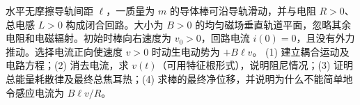 水平无摩擦导轨间距 \(\ell\)，一质量为 \(m\) 的导体棒可沿导轨滑动，并与电阻 \(R>0\)、总电感 \(L>0\) 构成闭合回路。大小为 \(B>0\) 的均匀磁场垂直轨道平面，忽略其余电阻和电磁辐射。初始时棒向右速度为 \(v_0>0\)，回路电流 \(i(0)=0\)，且没有外力推动。选择电流正向使速度 \(v>0\) 时动生电动势为 \(+B\ell v\)。
(1) 建立耦合运动及电路方程；(2) 消去电流，求 \(v(t)\)（可用特征根形式），说明阻尼情况；(3) 证明总能量耗散律及最终总焦耳热；(4) 求棒的最终净位移，并说明为什么不能简单地令感应电流为 \(B\ell v/R\)。
